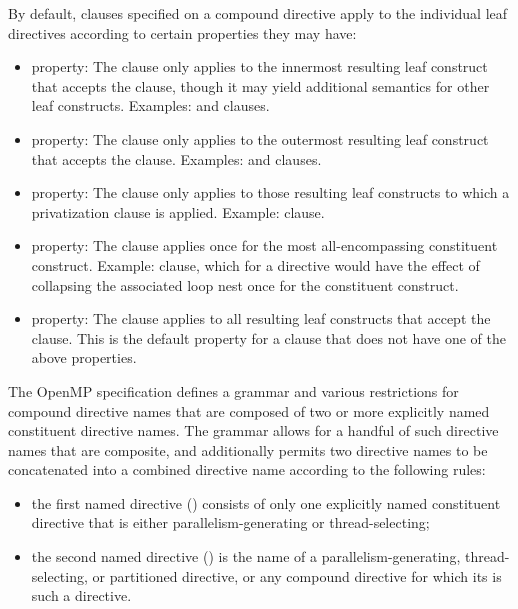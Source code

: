 By default, clauses specified on a compound directive apply to the
individual leaf directives according to certain properties they may have:
\begin{itemize}
\item {} property: The clause only applies to the innermost
      resulting leaf construct that accepts the clause, though it may yield
      additional semantics for other leaf constructs. Examples:
       and  clauses.
\item {} property: The clause only applies to the outermost
      resulting leaf construct that accepts the clause. Examples:
       and  clauses.
\item {} property: The clause only applies to those
      resulting leaf constructs to which a privatization clause is applied.
      Example:  clause.
\item {} property: The clause applies once for the
      most all-encompassing constituent construct. Example: 
      clause, which for a  directive would
      have the effect of collapsing the associated loop nest once for the
       constituent construct.
\item {} property: The clause applies to all
      resulting leaf constructs that accept the clause. This is the default
      property for a clause that does not have one of the above properties.
\end{itemize}

The OpenMP specification defines a grammar and various restrictions for
compound directive names that are composed of two or more explicitly named
constituent directive names. The grammar allows for a handful of such
directive names that are composite, and additionally permits two directive
names to be concatenated into a combined directive name according to the
following rules:

\begin{itemize}
\item the first named directive () consists of only one
      explicitly named constituent directive that is either
      parallelism-generating or thread-selecting;
\item the second named directive () is the name of a
      parallelism-generating, thread-selecting, or partitioned directive, or any
      compound directive for which its  is such a
      directive.
\end{itemize}

